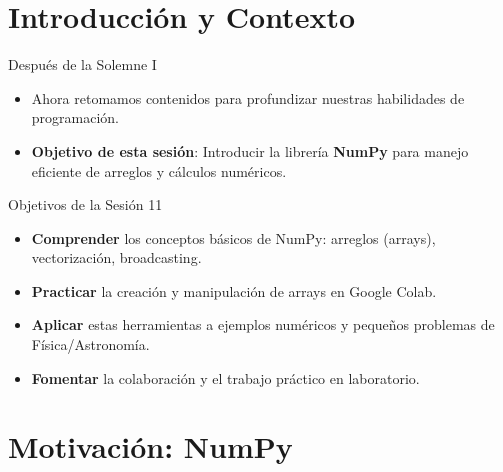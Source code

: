 \documentclass[10pt]{beamer}
\begin{document}
\section{Introducción y Contexto}

\begin{frame}{Después de la Solemne I}
  \begin{itemize}
    \item Ahora retomamos contenidos para profundizar nuestras habilidades de programación.
    \item \textbf{Objetivo de esta sesión}: Introducir la librería \textbf{NumPy} para manejo eficiente de arreglos y cálculos numéricos.
  \end{itemize}
\end{frame}

\begin{frame}{Objetivos de la Sesión 11}
  \begin{itemize}
    \item \textbf{Comprender} los conceptos básicos de NumPy: arreglos (arrays), vectorización, broadcasting.
    \item \textbf{Practicar} la creación y manipulación de arrays en Google Colab.
    \item \textbf{Aplicar} estas herramientas a ejemplos numéricos y pequeños problemas de Física/Astronomía.
    \item \textbf{Fomentar} la colaboración y el trabajo práctico en laboratorio.
  \end{itemize}
\end{frame}

\section{Motivación: NumPy}
\end{document}
